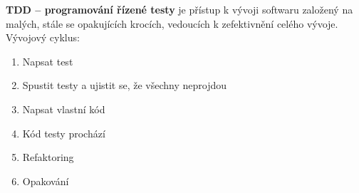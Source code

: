 \textbf{TDD – programování řízené testy} je přístup k vývoji softwaru založený na malých, stále se opakujících krocích, vedoucích k zefektivnění celého vývoje. Vývojový cyklus:
\begin{enumerate}
\item Napsat test
\item Spustit testy a ujistit se, že všechny neprojdou
\item Napsat vlastní kód
\item Kód testy prochází
\item Refaktoring
\item Opakování
\end{enumerate}